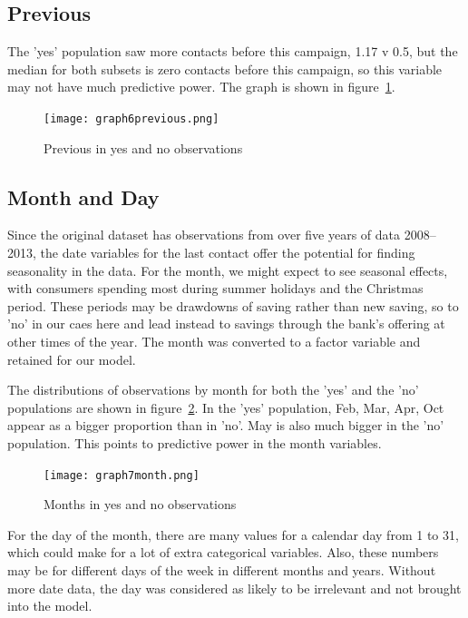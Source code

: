 \documentclass[9pt,technote]{IEEEtran}
\begin{document}
\subsection{Previous}

The 'yes' population saw more contacts before this campaign, 1.17 v 0.5, but the median for both subsets is zero contacts before this campaign, so this variable may not have much predictive power. The graph is shown in figure~\ref{fig:graph6previous}.  

\begin{figure}[htbp]
\centerline{\texttt{[image: graph6previous.png]}}
\caption{Previous in yes and no observations}
\label{fig:graph6previous}
\end{figure}

\subsection{Month and Day}

Since the original dataset has observations from over five years of data 2008--2013, the date variables for the last contact offer the potential for finding seasonality in the data.  For the month, we might expect to see seasonal effects, with consumers spending most during summer holidays and the Christmas period.   These periods may be drawdowns of saving rather than new saving, so to 'no' in our caes here and lead instead to savings through the bank's offering at other times of the year.  The month was converted to a factor variable and retained for our model.  

The distributions of observations by month for both the 'yes' and the 'no' populations are shown in 
figure~\ref{fig:graph7month}.  In the 'yes' population, Feb, Mar, Apr, Oct appear as a bigger proportion than in 'no'.  May is also much bigger in the 'no' population.  This points to predictive power in the month variables.  

\begin{figure}[htbp]
\centerline{\texttt{[image: graph7month.png]}}
\caption{Months in yes and no observations}
\label{fig:graph7month}
\end{figure}

For the day of the month, there are many values for a calendar day from 1 to 31, which could make for a lot of extra categorical variables.  Also, these numbers may be for different days of the week in different months and years.  Without more date data, the day was considered as likely to be irrelevant and not brought into the model.   
\end{document}
